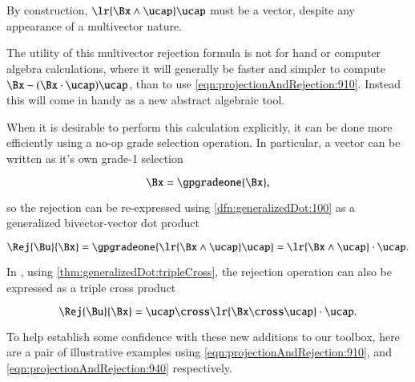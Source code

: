 By construction,
\( \lr{ \Bx \wedge \ucap } \ucap \) must be a vector, despite any appearance of a multivector nature.

The utility of this multivector rejection formula is not for hand or computer algebra calculations, where it will generally be faster and simpler to compute \( \Bx - (\Bx \cdot \ucap) \ucap \), than to use \cref{eqn:projectionAndRejection:910}.
Instead this will come in handy as a new abstract algebraic tool.

When it is desirable to perform this calculation explicitly, it can be done more efficiently using a no-op grade selection operation.
In particular, a vector can be written as it's own grade-1 selection

\begin{dmath}\label{eqn:projectionAndRejection:920}
\Bx = \gpgradeone{ \Bx },
\end{dmath}

so the rejection can be re-expressed
using \cref{dfn:generalizedDot:100}
as a generalized bivector-vector dot product

\begin{equation}\label{eqn:projectionAndRejection:940}
\Rej{\Bu}{\Bx}
= \gpgradeone{ \lr{ \Bx \wedge \ucap } \ucap }
= \lr{ \Bx \wedge \ucap } \cdot \ucap.
\end{equation}

In , using \cref{thm:generalizedDot:tripleCross}, the rejection operation can also be expressed as a triple cross product

\begin{dmath}\label{eqn:projectionAndRejection:1140}
\Rej{\Bu}{\Bx}
= \ucap \cross \lr{ \Bx \cross \ucap } \cdot \ucap.
\end{dmath}

To help establish some confidence with these new additions to our toolbox, here are a
pair of illustrative examples using
\cref{eqn:projectionAndRejection:910}, and
\cref{eqn:projectionAndRejection:940} respectively.


